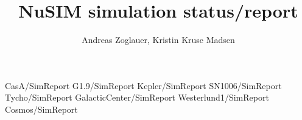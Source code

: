 \documentclass[12pt]{article}
\begin{document}
\title{NuSIM simulation status/report}
\author{Andreas Zoglauer, Kristin Kruse Madsen}



\maketitle
\tableofcontents

\newpage

 {CasA/SimReport}
 {G1.9/SimReport}
 {Kepler/SimReport}
 {SN1006/SimReport}
 {Tycho/SimReport}
 {GalacticCenter/SimReport}
 {Westerlund1/SimReport}
 {Cosmos/SimReport}
\end{document}

